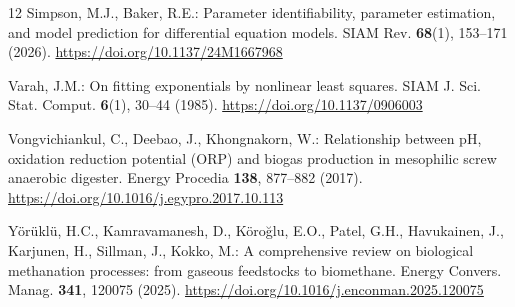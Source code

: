 \documentclass[runningheads]{llncs}
\begin{document}
\begin{thebibliography}{12}
Simpson, M.J., Baker, R.E.: Parameter identifiability, parameter
estimation, and model prediction for differential equation models.
SIAM Rev. \textbf{68}(1), 153--171 (2026).
\url{https://doi.org/10.1137/24M1667968}

Varah, J.M.: On fitting exponentials by nonlinear least squares. SIAM
J. Sci. Stat. Comput. \textbf{6}(1), 30--44 (1985).
\url{https://doi.org/10.1137/0906003}

Vongvichiankul, C., Deebao, J., Khongnakorn, W.: Relationship between
pH, oxidation reduction potential (ORP) and biogas production in
mesophilic screw anaerobic digester. Energy Procedia \textbf{138},
877--882 (2017).
\url{https://doi.org/10.1016/j.egypro.2017.10.113}

Y\"{o}r\"{u}kl\"{u}, H.C., Kamravamanesh, D., K\"{o}ro\u{g}lu, E.O.,
Patel, G.H., Havukainen, J., Karjunen, H., Sillman, J., Kokko, M.:
A comprehensive review on biological methanation processes: from gaseous
feedstocks to biomethane. Energy Convers. Manag. \textbf{341}, 120075
(2025).
\url{https://doi.org/10.1016/j.enconman.2025.120075}

\end{thebibliography}
\end{document}
